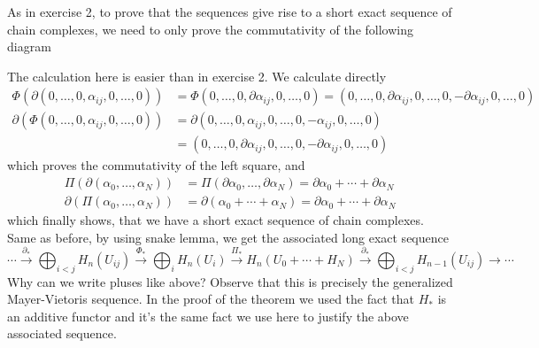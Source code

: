 \documentclass[a4paper, 12pt]{article}
\begin{document}
\begin{enumerate}
	As in exercise 2, to prove that the sequences give rise to a short exact sequence of chain complexes, we need to only prove the commutativity of the following diagram
	

	The calculation here is easier than in exercise 2. We calculate directly
	\begin{align*}
	\Phi(\partial(0,\dots,0,\alpha_{ij},0,\dots,0)) &= \Phi(0,\dots,0,\partial\alpha_{ij},0,\dots,0) = (0,\dots,0,\partial\alpha_{ij}, 0,\dots,0,-\partial\alpha_{ij}, 0,\dots,0) \\
	\partial(\Phi(0,\dots,0,\alpha_{ij},0,\dots,0)) &= \partial(0,\dots,0,\alpha_{ij}, 0,\dots,0,-\alpha_{ij}, 0,\dots,0) \\
	&= (0,\dots,0,\partial\alpha_{ij}, 0,\dots,0,-\partial\alpha_{ij}, 0,\dots,0)
	\end{align*}
	which proves the commutativity of the left square, and
	\begin{align*}
	\Pi(\partial(\alpha_0, \dots, \alpha_N)) &= \Pi(\partial\alpha_0, \dots, \partial\alpha_N) = \partial\alpha_0 + \cdots + \partial\alpha_N \\
	\partial(\Pi(\alpha_0, \dots, \alpha_N)) &= \partial(\alpha_0 + \cdots + \alpha_N) = \partial\alpha_0 + \cdots + \partial\alpha_N
	\end{align*}
	which finally shows, that we have a short exact sequence of chain complexes. Same as before, by using snake lemma, we get the associated long exact sequence
	\[
	\cdots \xrightarrow{\partial_*} \bigoplus_{i<j}H_n(U_{ij}) \xrightarrow{\Phi_*} \bigoplus_{i}H_n(U_i) \xrightarrow{\Pi_*} H_n(U_0 + \cdots + H_N) \xrightarrow{\partial_*} \bigoplus_{i<j}H_{n-1}(U_{ij}) \xrightarrow{} \cdots
	\]
	Why can we write pluses like above? Observe that this is precisely the generalized Mayer-Vietoris sequence. In the proof of the theorem we used the fact that $H_*$ is an additive functor and it's the same fact we use here to justify the above associated sequence.
	

\end{enumerate}
\end{document}
